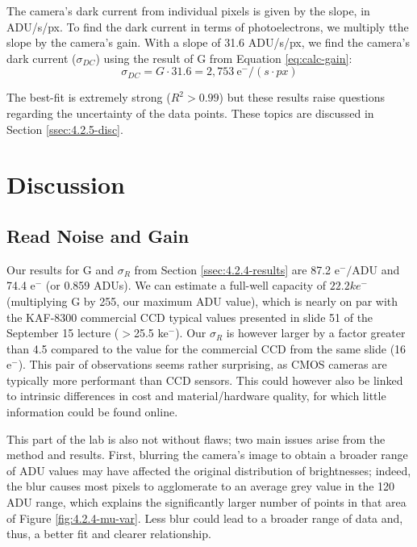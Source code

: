 \documentclass[preprint2]{aastex702}
\begin{document}
			The camera's dark current from individual pixels is given by the slope, in ADU/s/px. To find the dark current in terms of photoelectrons, we multiply tthe slope by the camera's gain. With a slope of 31.6 ADU/s/px, we find the camera's dark current ($\sigma_{DC}$) using the result of G from Equation \ref{eq:calc-gain}:
			\begin{equation}
				\sigma_{DC} = G \cdot 31.6 = 2,753  \ \text{e}^-/(s \cdot px)
			\end{equation}

			The best-fit is extremely strong ($R^2 > 0.99$) but these results raise questions regarding the uncertainty of the data points. These topics are discussed in Section \ref{ssec:4.2.5-disc}.

    \section{Discussion}\label{sec:disc}

		\subsection{Read Noise and Gain}\label{ssec:4.2.4-disc}

			Our results for G and $\sigma_R$ from Section \ref{ssec:4.2.4-results} are 87.2 e$^-/$ADU and 74.4 e$^-$ (or 0.859 ADUs). We can estimate a full-well capacity of $22.2 ke^-$ (multiplying G by 255, our maximum ADU value), which is nearly on par with the KAF-8300 commercial CCD typical values presented in slide 51 of the September 15 lecture ($>$25.5 ke$^-$). Our $\sigma_R$ is however larger by a factor greater than 4.5 compared to the value for the commercial CCD from the same slide (16 e$^-$). This pair of observations seems rather surprising, as CMOS cameras are typically more performant than CCD sensors. This could however also be linked to intrinsic differences in cost and material/hardware quality, for which little information could be found online.

			This part of the lab is also not without flaws; two main issues arise from the method and results. First, blurring the camera's image to obtain a broader range of ADU values may have affected the original distribution of brightnesses; indeed, the blur causes most pixels to agglomerate to an average grey value in the 120 ADU range, which explains the significantly larger number of points in that area of Figure \ref{fig:4.2.4-mu-var}. Less blur could lead to a broader range of data and, thus, a better fit and clearer relationship.
\end{document}
